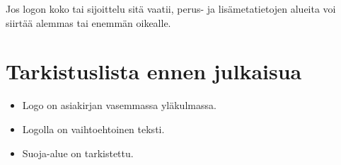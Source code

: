 \documentclass[sans-serif]{sfs-2487-2024}
\begin{document}
Jos logon koko tai sijoittelu sitä vaatii, perus- ja lisämetatietojen
alueita voi siirtää alemmas tai enemmän oikealle.

\section{Tarkistuslista ennen julkaisua}

\begin{itemize}
  \item[$\boxtimes$] Logo on asiakirjan vasemmassa yläkulmassa.
  \item[$\boxtimes$] Logolla on vaihtoehtoinen teksti.
  \item[$\square$] Suoja-alue on tarkistettu.
\end{itemize}


\makecontactinfo
\end{document}

